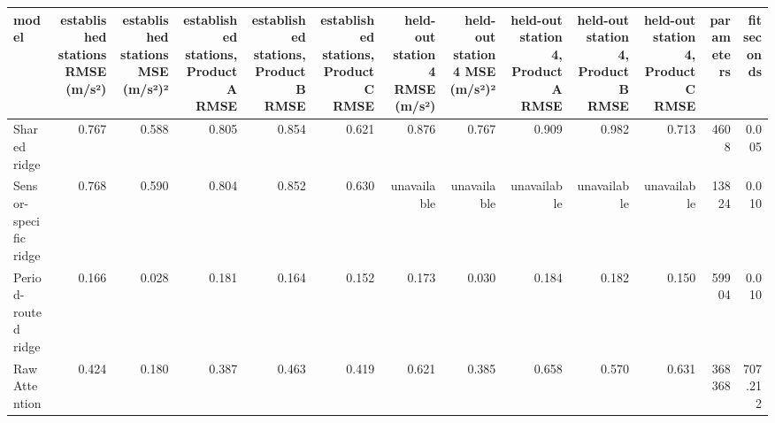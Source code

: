 \begin{tabular}{lrrrrrrrrrrrr}
\toprule
model & established stations RMSE (m/s²) & established stations MSE (m/s²)² & established stations, Product A RMSE & established stations, Product B RMSE & established stations, Product C RMSE & held-out station 4 RMSE (m/s²) & held-out station 4 MSE (m/s²)² & held-out station 4, Product A RMSE & held-out station 4, Product B RMSE & held-out station 4, Product C RMSE & parameters & fit seconds \\
\midrule
Shared ridge & 0.767 & 0.588 & 0.805 & 0.854 & 0.621 & 0.876 & 0.767 & 0.909 & 0.982 & 0.713 & 4608 & 0.005 \\
Sensor-specific ridge & 0.768 & 0.590 & 0.804 & 0.852 & 0.630 & unavailable & unavailable & unavailable & unavailable & unavailable & 13824 & 0.010 \\
Period-routed ridge & 0.166 & 0.028 & 0.181 & 0.164 & 0.152 & 0.173 & 0.030 & 0.184 & 0.182 & 0.150 & 59904 & 0.010 \\
Raw Attention & 0.424 & 0.180 & 0.387 & 0.463 & 0.419 & 0.621 & 0.385 & 0.658 & 0.570 & 0.631 & 368368 & 707.212 \\
\bottomrule
\end{tabular}
